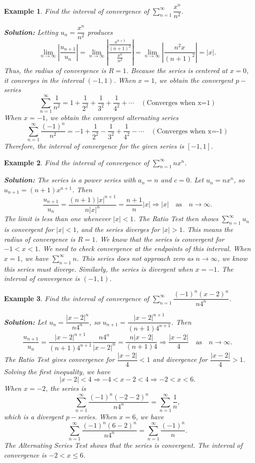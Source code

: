 \documentclass[titlepage,a4paper,12pt]{report}
\newtheorem{example}{Example}[section]
\begin{document}
\begin{example}
Find the interval of convergence of $\displaystyle \sum _{n=1}^\infty \dfrac{x^n}{n^2}$.

\noindent \textbf{Solution:} Letting $u_n=\dfrac{x^n}{n^2}$ produces 
\begin{equation*}
\lim _{n\rightarrow \infty} \left|\dfrac{u_{n+1}}{u_n}\right| = \lim _{n\rightarrow \infty}\left|\dfrac{\frac{x^{n+1}}{(n+1)^2}}{\frac{x^n}{n^2}}\right| =\lim _{n\rightarrow \infty} \left| \dfrac{n^2x}{(n+1)^2}\right| =|x|.
\end{equation*}
Thus, the radius of convergence is $R=1$. Because the series is centered at $x=0$, it converges in the interval $(-1,1)$. When  $x=1$, we obtain the convergent $p-$series \[\sum _{n=1}^\infty \dfrac{1}{n^2}=1+\dfrac{1}{2^2} +\dfrac{1}{3^2}+\dfrac{1}{4^2}+\cdots \quad (\mbox{Converges when x=1})\]
When $x=-1$, we obtain the convergent alternating series 
\[\sum _{n=1}^\infty \dfrac{(-1)^n}{n^2}=-1+\dfrac{1}{2^2}-\dfrac{1}{3^2}+\dfrac{1}{4^2}-\cdots \quad (\mbox{Converges when x=-1})\]
Therefore, the interval of convergence for the given series is $[-1,1]$.
\end{example}
\begin{example}
Find the interval of convergence of $\displaystyle \sum _{n=1}^\infty nx^n$.

\noindent \textbf{Solution:} The series is a power series with $a_n=n$ and $c=0$. Let $u_n=nx^n$, so $u_{n+1}=(n+1)x^{n+1}$. Then 
\[\dfrac{u_{n+1}}{u_n}=\dfrac{(n+1)|x|^{n+1}}{n|x|^n}=\dfrac{n+1}{n}|x|\Longrightarrow |x| \quad \mbox{as} \quad n\rightarrow \infty.\]
The limit is less than one whenever $|x|<1$. The Ratio Test then shows $\displaystyle \sum _{n=1}^\infty u_n$ is convergent for $|x|<1$, and the series diverges for $|x|>1$. This means the radius of convergence is $R=1$. We know that the series is convergent for $-1<x<1$. We need to check convergence at the endpoints of this interval. When $x=1$, we have $\displaystyle \sum _{n=1}^\infty n$. This series does not approach zero as $n\rightarrow \infty$, we know this series must diverge. Similarly, the series is divergent when $x=-1$. The interval of convergence is $(-1,1)$.
\end{example}
\begin{example}
Find the interval of convergence of $\displaystyle \sum _{n=1}^\infty \dfrac{(-1)^n(x-2)^n}{n4^n}$.

\noindent \textbf{Solution:} Let $u_n=\dfrac{|x-2|^n}{n4^n}$, so $u_{n+1}=\dfrac{|x-2|^{n+1}}{(n+1)4^{n+1}}$. Then 
\[\dfrac{u_{n+1}}{u_n}=\dfrac{|x-2|^{n+1}}{(n+1)4^{n+1}}\dfrac{n4^n}{|x-2|^n}=\dfrac{n|x-2|}{(n+1)4}\Longrightarrow \dfrac{|x-2|}{4}\quad \mbox{as} \quad n\rightarrow \infty.\]
The Ratio Test gives convergence for $\dfrac{|x-2|}{4}<1$ and divergence for $\dfrac{|x-2|}{4}>1$. Solving the first inequality, we have 
\[|x-2|<4\Longrightarrow -4<x-2<4\Longrightarrow -2<x<6.\]
When $x=-2$, the series is 
\[\sum _{n=1}^\infty \dfrac{(-1)^n(-2-2)^n}{n4^n}=\sum _{n=1}^\infty \dfrac{1}{n},\]
which is a divergent $p-$series. When $x=6$, we have 
\[\sum _{n=1}^\infty \dfrac{(-1)^n(6-2)^n}{n4^n}=\sum _{n=1}^\infty \dfrac{(-1)^n}{n}.\] The Alternating Series Test shows that the series is convergent. The interval of convergence is $-2<x\leq 6$.
\end{example}
\end{document}
